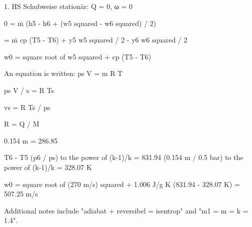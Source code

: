 1. HS Schubweise
stationär: Q = 0, ω = 0

0 = ṁ (h5 - h6 + (w5 squared - w6 squared) / 2)

= ṁ cp (T5 - T6) + y5 w5 squared / 2 - y6 w6 squared / 2

w0 = square root of w5 squared + cp (T5 - T6)

An equation is written: 
ps V = m R T

ps V / s = R Ts

vs = R Ts / ps

R = Q / M

0.154 m = 286.85

T6 - T5 (p6 / ps) to the power of (k-1)/k = 831.94 (0.154 m / 0.5 bar) to the power of (k-1)/k = 328.07 K

w0 = square root of (270 m/s) squared + 1.006 J/g K (831.94 - 328.07 K) = 507.25 m/s

Additional notes include "adiabat + reversibel = isentrop" and "m1 = m = k = 1.4".